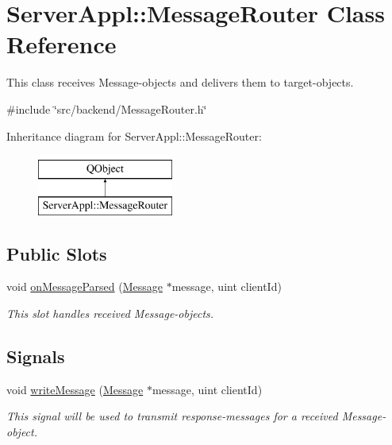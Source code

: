 \hypertarget{class_server_appl_1_1_message_router}{}\section{Server\+Appl\+:\+:Message\+Router Class Reference}
\label{class_server_appl_1_1_message_router}


This class receives Message-\/objects and delivers them to target-\/objects.  




{\ttfamily \#include \char`\"{}src/backend/\+Message\+Router.\+h\char`\"{}}

Inheritance diagram for Server\+Appl\+:\+:Message\+Router\+:\begin{figure}[H]
\begin{center}
\leavevmode
\includegraphics[height=2.000000cm]{class_server_appl_1_1_message_router}
\end{center}
\end{figure}
\subsection*{Public Slots}
\begin{DoxyCompactItemize}
\item 
void \hyperlink{class_server_appl_1_1_message_router_a89ce4becafb4e58791bcd3def1c279a3}{on\+Message\+Parsed} (\hyperlink{class_message}{Message} $\ast$message, uint client\+Id)
\begin{DoxyCompactList}\small\item\em This slot handles received Message-\/objects. \end{DoxyCompactList}\end{DoxyCompactItemize}
\subsection*{Signals}
\begin{DoxyCompactItemize}
\item 
void \hyperlink{class_server_appl_1_1_message_router_a07bf4019a746b53dfeb4400ee97159b9}{write\+Message} (\hyperlink{class_message}{Message} $\ast$message, uint client\+Id)
\begin{DoxyCompactList}\small\item\em This signal will be used to transmit response-\/messages for a received Message-\/object. \end{DoxyCompactList}\end{DoxyCompactItemize}
